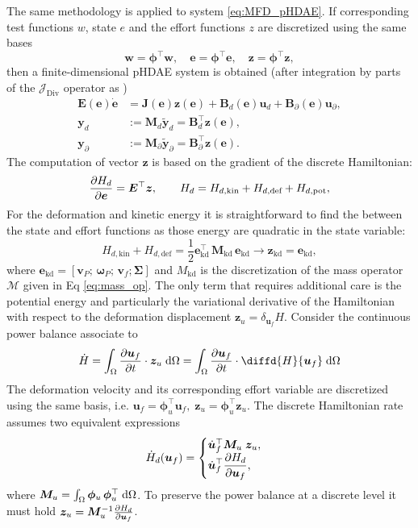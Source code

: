 \documentclass{svjour3}                     %
\DeclareMathOperator*{\Div}{Div}
\begin{document}
The same methodology is applied to system \eqref{eq:MFD_pHDAE}. If corresponding test functions $w$, state $e$ and the effort functions $z$ are discretized using the same bases
\[ \bm{w} = \bm{\phi}^\top \bm{w}, \quad \bm{e} = \bm{\phi}^\top \bm{e}, \quad \bm{z} = \bm{\phi}^\top \bm{z},
\]
then a finite-dimensional pHDAE system is obtained (after integration by parts of the $\mathcal{J}_{\Div}$ operator as )
\begin{equation}
	\begin{aligned}
	\bm{E}(\bm{e}) \dot{\bm{e}} &= \bm{J}(\bm{e}) \bm{z}(\bm{e}) + \bm{B}_d(\bm{e}) \bm{u}_d + \bm{B}_\partial(\bm{e}) \bm{u}_\partial, \\
	\bm{y}_d &:= \bm{M}_d \widetilde{\bm{y}}_d = \bm{B}_d^\top \bm{z}(\bm{e}),  \\
	\bm{y}_\partial &:= \bm{M}_\partial \widetilde{\bm{y}}_\partial = \bm{B}_\partial^\top \bm{z}(\bm{e}).
	\end{aligned}
\end{equation}
The computation of vector $\bm{z}$ is based on the gradient of the discrete Hamiltonian:
\[
\diffp{H_d}{\bm{e}} = \bm{E}^\top \bm{z}, \qquad H_d = H_{d, \text{kin}}+H_{d, \text{def}}+H_{d, \text{pot}},
\]
For the deformation and kinetic energy it is straightforward to find the between the state and effort functions as those energy are quadratic in the state variable:
\begin{equation}
H_{d, \text{kin}} + H_{d, \text{def}} = \frac{1}{2} \bm{e}_{\text{kd}}^\top \, \bm{M}_{\text{kd}} \, \bm{e}_{\text{kd}} \longrightarrow \bm{z}_{\text{kd}} = \bm{e}_{\text{kd}},
\end{equation}
where $\bm{e}_{\text{kd}} = [\bm{v}_P; \, \bm{\omega}_P; \, \bm{v}_f; \bm{\Sigma}]$ and ${M}_{\text{kd}}$ is the discretization of the mass operator $\mathcal{M}$ given in Eq \eqref{eq:mass_op}. 
The only term that requires additional care is the potential energy and particularly the variational derivative of the Hamiltonian with respect to the deformation displacement $\bm{z}_{u}=\delta_{\bm{u}_f} H$.  Consider the continuous power balance associate to
\[
\dot{H} = \int_{\Omega} \diffp{\bm{u}_f}{t} \cdot \bm{z}_{u} \d{\Omega} = \int_{\Omega} \diffp{\bm{u}_f}{t} \cdot \diffd{H}{\bm{u}_f} \d{\Omega}
\]
The deformation velocity and its corresponding effort variable are discretized using the same basis, i.e. $\bm{u}_f = \bm{\phi}_u^\top \bm{u}_f, \; \bm{z}_u = \bm{\phi}_u^\top \bm{z}_u$. The discrete Hamiltonian rate assumes two equivalent expressions
\begin{equation*}
\dot{H}_d(\bm{u}_f) = 
\begin{cases}
\dot{\bm{u}}_f^\top \bm{M}_u \; \bm{z}_u, \\
\displaystyle \dot{\bm{u}}_f^\top \diffp{H_d}{\bm{u}_f},
\end{cases}
\end{equation*}
where $\bm{M}_u=\int_{\Omega} \bm{\phi}_u \, \bm{\phi}_u^\top \d{\Omega}$. To preserve the power balance at a discrete level it must hold $ \bm{z}_u = \bm{M}_u^{-1} \diffp{H_d}{\bm{u}_f}$. \\
\end{document}
